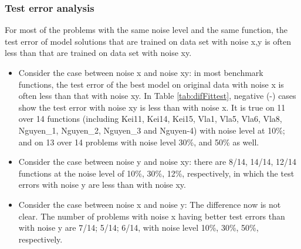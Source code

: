 \subsubsection{Test error analysis}
\label{AnaDiffMag}

For most of the problems with the same noise level and the same function, the test error of model solutions that are trained on data set with noise x,y is often less than that are trained on data set with noise xy.

\begin{itemize}
\item Consider the case between noise x and noise xy: in most benchmark functions, the test error of the best model on original data with noise x is often less than that with noise xy. In Table \ref{tab:difFittest}, negative (-) cases show the test error with noise xy is less than with noise x. It is true on 11 over 14 functions (including Kei11, Kei14, Kei15, Vla1, Vla5, Vla6, Vla8, Nguyen\_1, Nguyen\_2, Nguyen\_3 and Nguyen-4) with noise level at 10\%; and on 13 over 14 problems with noise level 30\%, and 50\% as well.

\item Consider the case between noise y and noise xy: there are 8/14, 14/14, 12/14 functions at the noise level of 10\%, 30\%, 12\%, respectively, in which the test errors with noise y are less than with noise xy.

\item Consider the case between noise x and noise y: The difference now is not clear. The number of problems with noise x having better test errors than with noise y are 7/14; 5/14; 6/14, with noise level 10\%, 30\%, 50\%, respectively.

\end{itemize} \par
